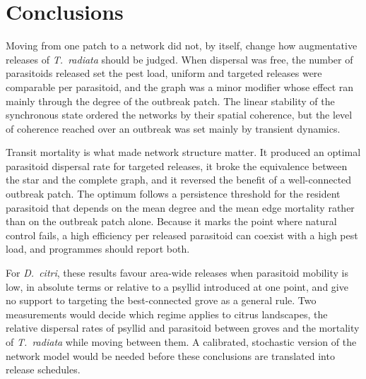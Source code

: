 
\section{Conclusions}
\label{sec:conclusions}

Moving from one patch to a network did not, by itself, change how augmentative releases of \textit{T.~radiata} should be judged. When dispersal was free, the number of parasitoids released set the pest load, uniform and targeted releases were comparable per parasitoid, and the graph was a minor modifier whose effect ran mainly through the degree of the outbreak patch. The linear stability of the synchronous state ordered the networks by their spatial coherence, but the level of coherence reached over an outbreak was set mainly by transient dynamics.

Transit mortality is what made network structure matter. It produced an optimal parasitoid dispersal rate for targeted releases, it broke the equivalence between the star and the complete graph, and it reversed the benefit of a well-connected outbreak patch. The optimum follows a persistence threshold for the resident parasitoid that depends on the mean degree and the mean edge mortality rather than on the outbreak patch alone. Because it marks the point where natural control fails, a high efficiency per released parasitoid can coexist with a high pest load, and programmes should report both.

For \textit{D.~citri}, these results favour area-wide releases when parasitoid mobility is low, in absolute terms or relative to a psyllid introduced at one point, and give no support to targeting the best-connected grove as a general rule. Two measurements would decide which regime applies to citrus landscapes, the relative dispersal rates of psyllid and parasitoid between groves and the mortality of \textit{T.~radiata} while moving between them. A calibrated, stochastic version of the network model would be needed before these conclusions are translated into release schedules.
